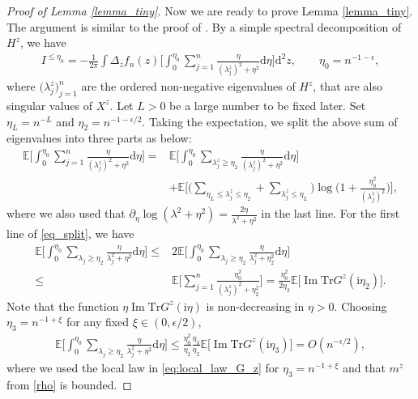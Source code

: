 \documentclass[10pt,reqno]{amsart}
\renewcommand{\Im}{\operatorname{Im}}
\newcommand{\dd}{\mathrm{d}}
\newcommand{\ii}{\mathrm{i}}
\newcommand{\<}{\langle}
\renewcommand{\>}{\rangle}
\numberwithin{equation}{section}
\begin{document}
\begin{proof}[Proof of Lemma \ref{lemma_tiny}]
	
	Now we are ready to prove Lemma \ref{lemma_tiny}. The argument is similar to the proof of \cite[Lemma 4]{zbMATH07329432}. By a simple spectral decomposition of $H^{z}$, we have
	\begin{align}\label{int_small}
		I^{\leq\eta_0} = -\frac{1}{2\pi} \int \Delta_z f_n(z) \Big[\int_{0}^{\eta_0} \sum_{j=1}^{n} \frac{\eta}{(\lambda_j^z)^2+\eta^2} \dd \eta \Big] \dd^2 z, \qquad \eta_0=n^{-1-\epsilon},
	\end{align}
where $\big(\lambda^{z}_{j}\big)_{j=1}^n$ are the ordered non-negative eigenvalues of $H^{z}$, that are also singular values of $X^z$.
	Let $L>0$ be a large number to be fixed later.  Set $\eta_L=n^{-L}$ and $\eta_2=n^{-1-\epsilon/2}$. Taking the expectation, we split the above sum of eigenvalues into three parts as below:
	\begin{align}\label{eq_split}
		\mathbb{E} \Big[\int_{0}^{\eta_0} \sum_{j=1}^{n} \frac{\eta}{(\lambda^z_j)^2+\eta^2} \dd \eta \Big]=&\mathbb{E} \Big[\int_{0}^{\eta_0} \sum_{\lambda^z_j \geq \eta_2} \frac{\eta}{(\lambda_j^z)^2+\eta^2} \dd \eta \Big]\nonumber\\
		&+\mathbb{E}\Big[ \Big(\sum_{\eta_L\leq \lambda^z_j \leq \eta_2} +\sum_{\lambda^z_j\leq \eta_L}\Big) \log \Big( 1+\frac{\eta_0^2}{(\lambda^z_j)^2}\Big)\Big],
	\end{align}
	where we also used that $\partial_\eta \log(\lambda^2+\eta^2)=\frac{2\eta}{\lambda^2+\eta^2}$ in the last line. For the first line of \eqref{eq_split}, we have
	\begin{align}
		\mathbb{E} \Big[\int_{0}^{\eta_0} \sum_{\lambda_j \geq \eta_2} \frac{\eta}{\lambda_j^2+\eta^2} \dd \eta  \Big]
		\leq &2\mathbb{E} \Big[\int_{0}^{\eta_0} \sum_{\lambda_j\geq \eta_2} \frac{\eta}{\lambda_j^2+\eta_2^2} \dd \eta  \Big]\nonumber\\
		\leq & \mathbb{E} \Big[ \sum_{j=1}^{n} \frac{\eta_0^2}{(\lambda^z_j)^2+\eta_2^2}   \Big]= \frac{\eta_0^2}{2\eta_2} \mathbb{E} \big[\Im\mathrm{Tr}G^{z}(\ii \eta_2)\big].
	\end{align}
	Note that the function $\eta\Im\mathrm{Tr}G^{z}(\ii \eta)$ is non-decreasing in $\eta>0$. Choosing  $\eta_3=n^{-1+\xi}$
    for any fixed $\xi \in (0,\epsilon/2)$,
	\begin{align}\label{eq_last}
		\mathbb{E} \Big[\int_{0}^{\eta_0} \sum_{\lambda_j\geq \eta_2} \frac{\eta}{\lambda_j^2+\eta^2} \dd \eta  \Big] \leq
		\frac{\eta_0^2}{\eta_2} \frac{\eta_3}{\eta_2} \mathbb{E} \big[\Im\mathrm{Tr}G^{z}(\ii \eta_3)\big] =O (n^{-\epsilon/2}),
	\end{align}
	where we used the local law in \eqref{eq:local_law_G_z}  for $\eta_3=n^{-1+\xi}$
    and that $m^z$ from \eqref{rho} is bounded.
	

\end{proof}
\end{document}
